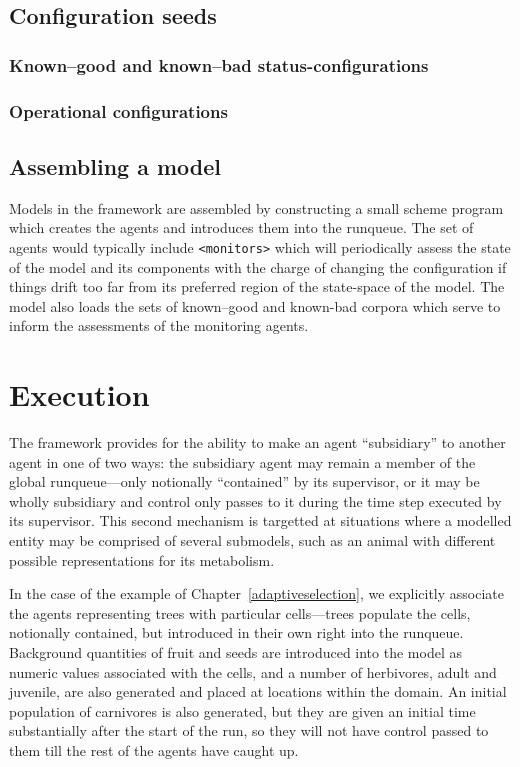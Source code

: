 \subsection{Configuration seeds}

\subsubsection{Known--good and known--bad status-configurations}

\subsubsection{Operational configurations}


\subsection{Assembling a model}
Models in the framework are assembled by constructing a small scheme
program which creates the agents and introduces them into the
runqueue. The set of agents would typically include
\texttt{<monitors>} which will periodically assess the state of the
model and its components with the charge of changing the configuration
if things drift too far from its preferred region of the state-space
of the model.  The model also loads the sets of known--good
and known-bad corpora which serve to inform the assessments of the
monitoring agents.





\section{Execution}

The framework provides for the ability to make an agent
``subsidiary'' to another agent in one of two ways: the subsidiary
agent may remain a member of the global runqueue---only notionally
``contained'' by its supervisor, or it may be wholly subsidiary and
control only passes to it during the time step executed by its
supervisor. This second mechanism is targetted at situations where a
modelled entity may be comprised of several submodels, such as an
animal with different possible representations for its metabolism. 

In the case of the example of Chapter~\ref{adaptiveselection}, we
explicitly associate the agents representing trees with particular
cells---trees populate the cells, notionally contained, but
introduced in their own right into the runqueue.  Background
quantities of fruit and seeds are introduced into the model as numeric
values associated with the cells, and a number of herbivores, adult
and juvenile, are also generated and placed at locations within the
domain. An initial population of carnivores is also generated, but
they are given an initial time substantially after the start of the
run, so they will not have control passed to them till the rest of the
agents have caught up.

